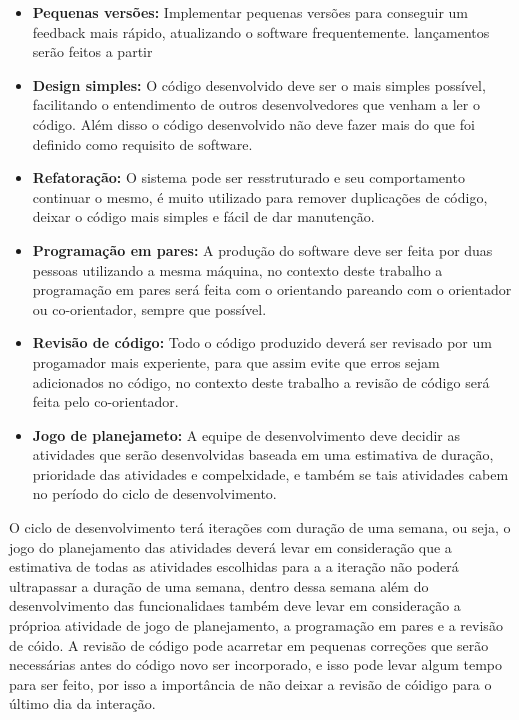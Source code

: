 \begin{itemize}
  \item \textbf{Pequenas versões:} Implementar pequenas versões para conseguir
  um feedback mais rápido, atualizando o software frequentemente.
lançamentos serão feitos a partir
  \item \textbf{Design simples:} O código desenvolvido deve ser o mais simples possível,
  facilitando o entendimento de outros desenvolvedores que venham a ler o código.
  Além disso o código desenvolvido não deve fazer mais do que foi definido como
  requisito de software.
  \item \textbf{Refatoração:} O sistema pode ser resstruturado e seu comportamento
  continuar o mesmo, é muito utilizado para remover duplicações de código, deixar
  o código mais simples e fácil de dar manutenção.
  \item \textbf{Programação em pares:} A produção do software deve ser feita por duas
  pessoas utilizando a mesma máquina, no contexto deste trabalho a programação
  em pares será feita com o orientando pareando com o orientador ou co-orientador,
  sempre que possível.
  \item \textbf{Revisão de código:} Todo o código produzido deverá ser revisado
  por um progamador mais experiente, para que assim evite que erros sejam
  adicionados no código, no contexto deste trabalho a revisão de código será
  feita pelo co-orientador.
  \item \textbf{Jogo de planejameto:} A equipe de desenvolvimento deve decidir
  as atividades que serão desenvolvidas baseada em uma estimativa de duração,
  prioridade das atividades e compelxidade, e também se tais atividades cabem
  no período do ciclo de desenvolvimento.
\end{itemize}

O ciclo de desenvolvimento terá iterações com duração de uma semana, ou seja,
o jogo do planejamento das atividades deverá levar em consideração que a
estimativa de todas as atividades escolhidas para a a iteração não poderá
ultrapassar a duração de uma semana, dentro dessa semana além do desenvolvimento
das funcionalidaes também deve levar em consideração a próprioa atividade de jogo
de planejamento, a programação em pares e a revisão de cóido. A revisão de código
pode acarretar em pequenas correções que serão necessárias antes do código novo
ser incorporado, e isso pode levar algum tempo para ser feito, por isso a importância
de não deixar a revisão de cóidigo para o último dia da interação.

